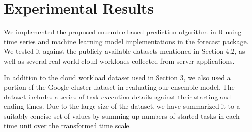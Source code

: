 
\section{Experimental Results}

We implemented the proposed ensemble-based prediction algorithm in R using time series and machine learning model implementations in the forecast package. We tested it against the publicly available datasets mentioned in Section 4.2, as well as several real-world cloud workloads \cite{AutoscaleAnalyser} collected from server applications.

In addition to the cloud workload dataset used in Section 3, we also used a portion of the Google cluster dataset \cite{GoogleClusterData} in evaluating our ensemble model. The dataset includes a series of task execution details against their starting and ending times. Due to the large size of the dataset, we have summarized it to a suitably concise set of values by summing up numbers of started tasks in each time unit over the transformed time scale.

